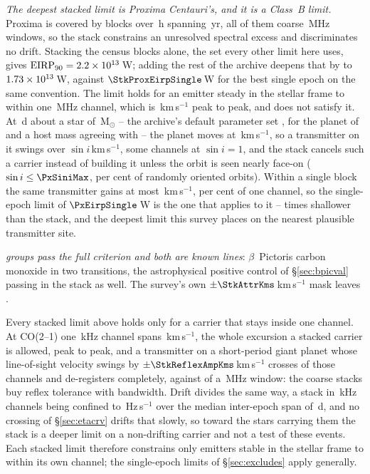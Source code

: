 \emph{The deepest stacked limit is Proxima Centauri's, and it is a Class~B
limit.} Proxima is covered by \StkProxN{} blocks over \StkProxHours\,h
spanning \StkProxSpanYr\,yr, all of them coarse \ChanBModeMHz\,MHz windows,
so the stack constrains an unresolved spectral excess and discriminates no
drift. Stacking the census blocks alone, the set every other limit here uses,
gives $\mathrm{EIRP}_{90}=2.2\times10^{13}$\,W; adding the rest of the
archive deepens that by \SzProxDeepen{} to $1.73\times10^{13}$\,W, against
$\StkProxEirpSingle$\,W for the best single epoch on the same convention.
The limit holds for an emitter steady in the stellar frame to within one
\ChanBModeMHz\,MHz channel, which is \StkProxTolKms\,km\,s$^{-1}$ peak to
peak, and \PxPlanet{} does not satisfy it. At \PxPorbD\,d about a star of
\PxMassMsun\,M$_\odot$ -- the archive's default parameter set
\citep{NEA2013}, for the planet of \citet{AngladaEscude2016} and a host mass
agreeing with \citet{Kervella2017} -- the planet moves at
\PxVorbKms\,km\,s$^{-1}$, so a
transmitter on it swings over \PxPPKms$\sin i$\,km\,s$^{-1}$, some
\PxNChanWalk{} channels at $\sin i=1$, and the stack cancels such a
carrier instead of building it unless the orbit is seen nearly face-on
($\sin i\le\PxSiniMax$, \PxIsoPct{} per cent of randomly oriented orbits).
Within a single block the same transmitter gains
at most \PxBlockDvKms\,km\,s$^{-1}$, \PxBlockPct{} per cent of one channel,
so the single-epoch limit of $\PxEirpSingle$\,W is the one that applies to
it -- \PxEirpRatio{} times shallower than the stack, and the deepest limit
this survey places on the nearest plausible transmitter site.

\emph{\StkNSurvive{} groups pass the full criterion and both are known
lines}: $\beta$~Pictoris carbon monoxide in two transitions, the astrophysical
positive control of \S\ref{sec:bpicval} passing in the stack as well. The
survey's own $\pm\StkAttrKms$\,km\,s$^{-1}$ mask leaves \StkUnattrClause.

Every stacked limit above holds only for a carrier that stays inside one
channel. At CO(2--1) one \StkRefChanKHz\,kHz channel spans
\StkTolFineKms\,km\,s$^{-1}$, the whole excursion a stacked carrier is
allowed, peak to peak, and a transmitter on a short-period giant planet whose
line-of-sight velocity swings by $\pm\StkReflexAmpKms$\,km\,s$^{-1}$ crosses
\SzReflexPPChanFine{} of those channels and de-registers completely, against
\SzReflexPPChanCoarse{} of a \ChanBModeMHz\,MHz window: the coarse stacks buy
reflex tolerance with bandwidth. Drift divides the same way, a
stack in \StkRefChanKHz\,kHz channels being confined to
\StkDriftTolHzS\,Hz\,s$^{-1}$ over the median inter-epoch span of
\StkSpanMedD\,d, and no crossing of \S\ref{sec:etacrv} drifts that slowly, so
toward the \SttNHostStar{} stars carrying them the stack is a deeper limit on
a non-drifting carrier and not a test of these events. Each
stacked limit therefore constrains only emitters stable in the stellar frame to
within its own channel; the single-epoch limits of \S\ref{sec:excludes} apply
generally.

